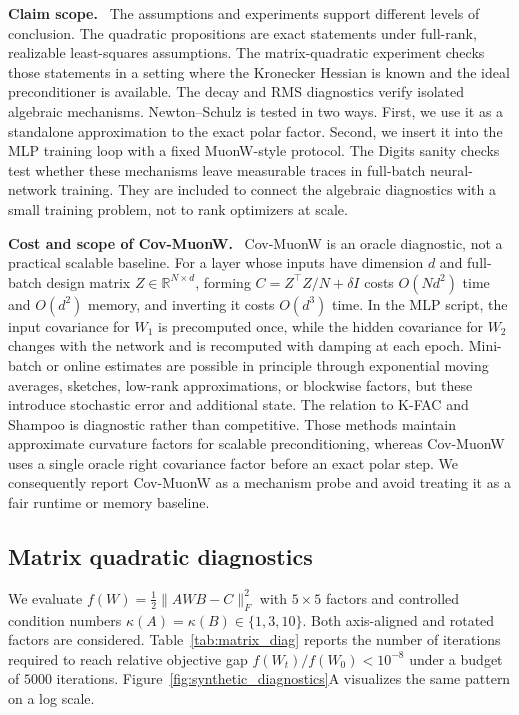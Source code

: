\documentclass[sigconf,nonacm]{acmart}
\newcommand{\vpara}[1]{\par\noindent\textbf{#1.}\ }
\begin{document}
\vpara{Claim scope} The assumptions and experiments support different levels of conclusion. The quadratic propositions are exact statements under full-rank, realizable least-squares assumptions. The matrix-quadratic experiment checks those statements in a setting where the Kronecker Hessian is known and the ideal preconditioner is available. The decay and RMS diagnostics verify isolated algebraic mechanisms. Newton--Schulz is tested in two ways. First, we use it as a standalone approximation to the exact polar factor. Second, we insert it into the MLP training loop with a fixed MuonW-style protocol. The Digits sanity checks test whether these mechanisms leave measurable traces in full-batch neural-network training. They are included to connect the algebraic diagnostics with a small training problem, not to rank optimizers at scale.

\vpara{Cost and scope of Cov-MuonW} Cov-MuonW is an oracle diagnostic, not a practical scalable baseline. For a layer whose inputs have dimension $d$ and full-batch design matrix $Z\in\mathbb{R}^{N\times d}$, forming $C=Z^\top Z/N+\delta I$ costs $O(Nd^2)$ time and $O(d^2)$ memory, and inverting it costs $O(d^3)$ time. In the MLP script, the input covariance for $W_1$ is precomputed once, while the hidden covariance for $W_2$ changes with the network and is recomputed with damping at each epoch. Mini-batch or online estimates are possible in principle through exponential moving averages, sketches, low-rank approximations, or blockwise factors, but these introduce stochastic error and additional state. The relation to K-FAC and Shampoo is diagnostic rather than competitive. Those methods maintain approximate curvature factors for scalable preconditioning, whereas Cov-MuonW uses a single oracle right covariance factor before an exact polar step. We consequently report Cov-MuonW as a mechanism probe and avoid treating it as a fair runtime or memory baseline.

\subsection{Matrix quadratic diagnostics}
We evaluate $f(W)=\frac12\|AWB-C\|_F^2$ with $5\times5$ factors and controlled condition numbers $\kappa(A)=\kappa(B)\in\{1,3,10\}$. Both axis-aligned and rotated factors are considered. Table~\ref{tab:matrix_diag} reports the number of iterations required to reach relative objective gap $f(W_t)/f(W_0)<10^{-8}$ under a budget of $5000$ iterations. Figure~\ref{fig:synthetic_diagnostics}A visualizes the same pattern on a log scale.
\end{document}
